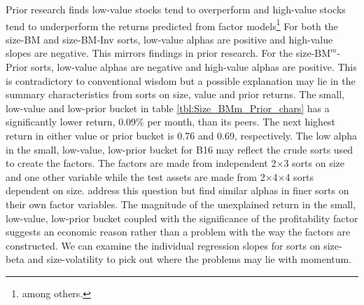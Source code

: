 Prior research finds low-value stocks tend to overperform and high-value stocks
tend to underperform the returns predicted from factor models\footnote{
\textcite{fama1992cross, fama1993common, loughran1997book, fama2006value}
among others.}
For both the size-BM and size-BM-Inv sorts, low-value alphas are positive and
high-value slopes are negative.
This mirrors findings in prior research.
For the size-$\text{BM}^m$-Prior sorts, low-value alphas are negative and
high-value alphas are positive.
This is contradictory to conventional wisdom but a possible explanation may lie
in the summary characteristics from sorts on size, value and prior returns.
The small, low-value and low-prior bucket in table
\ref{tbl:Size_BMm_Prior_chars} has a significantly lower return, 0.09\% per
month, than its peers.
The next highest return in either value or prior bucket is 0.76 and 0.69,
respectively.
The low alpha in the small, low-value, low-prior bucket for B16 may reflect
the crude sorts used to create the factors.
The factors are made from independent 2$\times$3 sorts on size and one other
variable while the test assets are made from 2$\times$4$\times$4 sorts
dependent on size.
\textcite{fama2015five} address this question but find similar alphas in finer
sorts on their own factor variables.
The magnitude of the unexplained return in the small, low-value, low-prior
bucket coupled with the significance of the profitability factor suggests an
economic reason rather than a problem with the way the factors are constructed.
We can examine the individual regression slopes for sorts on size-beta and
size-volatility to pick out where the problems may lie with momentum.
